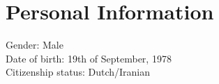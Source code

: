 \section{Personal Information}
\begin{flushleft}
  Gender: Male \\
  Date of birth: 19th of September, 1978 \\
  Citizenship status: Dutch/Iranian
\end{flushleft} 
